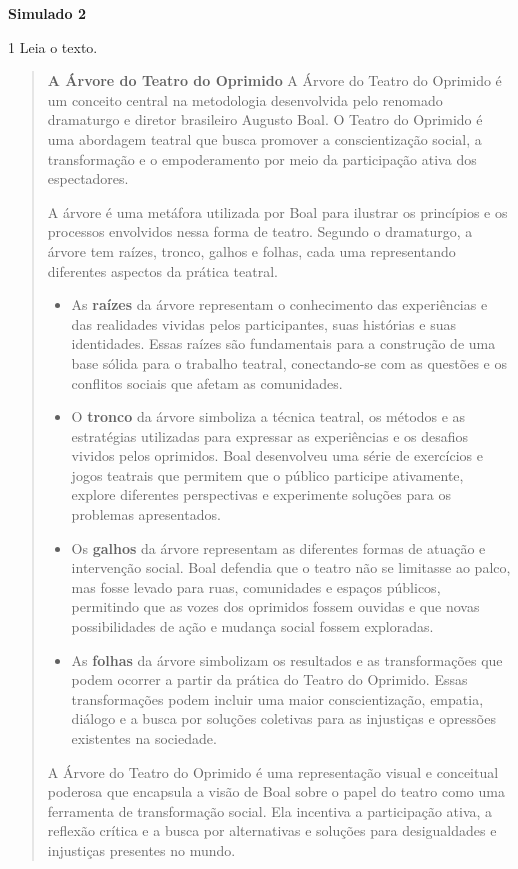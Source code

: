 \textbf{Simulado 2}

\num{1} Leia o texto.

\begin{quote}
\textbf{A Árvore do Teatro do Oprimido}
A Árvore do Teatro do Oprimido é um conceito central na metodologia desenvolvida pelo renomado dramaturgo e 
diretor brasileiro Augusto Boal. O Teatro do Oprimido é uma abordagem teatral que busca promover a 
conscientização social, a transformação e o empoderamento por meio da participação ativa dos espectadores.

A árvore é uma metáfora utilizada por Boal para ilustrar os princípios e os processos envolvidos nessa 
forma de teatro. Segundo o dramaturgo, a árvore tem raízes, tronco, galhos e folhas, cada uma representando diferentes aspectos da prática teatral.

\begin{itemize}
  \item As \textbf{raízes} da árvore representam o conhecimento das experiências e das realidades vividas 
  pelos participantes, suas histórias e suas identidades. Essas raízes são fundamentais para a construção 
  de uma base sólida para o trabalho teatral, conectando-se com as questões e os conflitos sociais que 
  afetam as comunidades.
  \item O \textbf{tronco} da árvore simboliza a técnica teatral, os métodos e as estratégias utilizadas 
  para expressar as experiências e os desafios vividos pelos oprimidos. Boal desenvolveu uma série de 
  exercícios e jogos teatrais que permitem que o público participe ativamente, explore diferentes 
  perspectivas e experimente soluções para os problemas apresentados.
  \item Os \textbf{galhos} da árvore representam as diferentes formas de atuação e intervenção social. Boal 
  defendia que o teatro não se limitasse ao palco, mas fosse levado para ruas, comunidades e espaços 
  públicos, permitindo que as vozes dos oprimidos fossem ouvidas e que novas possibilidades de ação e 
  mudança social fossem exploradas.
  \item As \textbf{folhas} da árvore simbolizam os resultados e as transformações que podem ocorrer a 
  partir da prática do Teatro do Oprimido. Essas transformações podem incluir uma maior conscientização, 
  empatia, diálogo e a busca por soluções coletivas para as injustiças e opressões existentes na sociedade.
\end{itemize}

A Árvore do Teatro do Oprimido é uma representação visual e conceitual poderosa que encapsula a visão de 
Boal sobre o papel do teatro como uma ferramenta de transformação social. Ela incentiva a participação 
ativa, a reflexão crítica e a busca por alternativas e soluções para desigualdades e injustiças presentes 
no mundo.

\end{quote}


